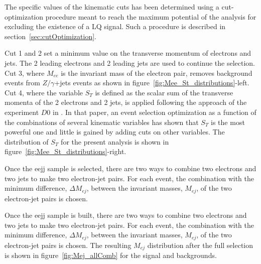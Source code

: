 \documentclass{cmspaper}
\begin{document}
\begin{linenumbers}
The specific values of the kinematic cuts has been determined using a cut-optimization procedure meant to
reach the maximum potential of the analysis for excluding the existence of a LQ signal. 
Such a procedure is described in section~\ref{sec:cutOptimization}.

Cut 1 and 2 set a minimum value on the transverse momentum of electrons and jets. 
The 2 leading electrons and 2 leading jets are used to continue the selection.
Cut 3, where $M_{ee}$ is the invariant mass of the electron pair, removes background events from 
$Z/\gamma$+jets events as shown in figure~\ref{fig:Mee_St_distributions}-left.
Cut 4, where the variable $S_T$ is defined as the scalar sum of the transverse momenta of the 
2 electrons and 2 jets, is applied following the approach of the experiment $D0$ in 
\cite{Abazov:2001mx}. In that paper, an event selection optimization as a function of
the combinations of several kinematic variables has shown that $S_T$ is the most powerful one 
and little is gained by adding cuts on other variables. The distribution of $S_T$ for the present
analysis is shown in figure~\ref{fig:Mee_St_distributions}-right.

Once the eejj sample is selected, there are two ways to combine two electrons and two jets to make two electron-jet pairs. 
For each event, the combination with the minimum difference, $\Delta M_{ej}$, between the invariant masses, $M_{ej}$, 
of the two electron-jet pairs is chosen.

Once the eejj sample is built, there are two ways to combine two electrons and two jets to make two electron-jet pairs. 
For each event, the combination with the minimum difference, $\Delta M_{ej}$, between the invariant masses, $M_{ej}$, 
of the two electron-jet pairs is chosen. 
The resulting $M_{ej}$ distribution after the full selection is shown in figure~\ref{fig:Mej_allComb} for the signal and backgrounds. 


\end{linenumbers}
\end{document}
